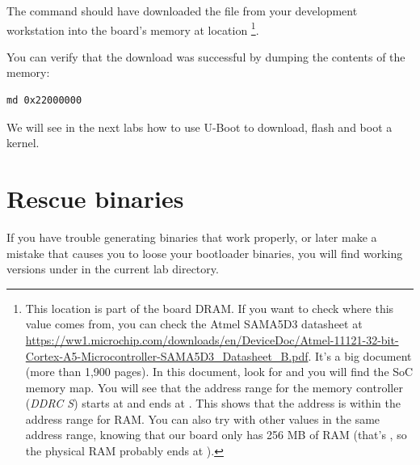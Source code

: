 The  command should have downloaded the
 file from your development workstation into
the board's memory at location \footnote{
This location is part of the board DRAM. If you want
to check where this value comes from, you can check the Atmel SAMA5D3
datasheet at
\url{https://ww1.microchip.com/downloads/en/DeviceDoc/Atmel-11121-32-bit-Cortex-A5-Microcontroller-SAMA5D3_Datasheet_B.pdf}.
It's a big document (more than 1,900 pages). In this document, look
for  and you will find the SoC memory map. You
will see that the address range for the memory controller ({\em DDRC
S}) starts at  and ends at . This
shows that the  address is within the address range
for RAM. You can also try with other values in the same address range,
knowing that our board only has 256 MB of RAM (that's
, so the physical RAM probably ends at
).}.

You can verify that the download was successful by dumping the
contents of the memory:

\begin{verbatim}
md 0x22000000
\end{verbatim}

We will see in the next labs how to use U-Boot to download, flash and
boot a kernel.

\section{Rescue binaries}

If you have trouble generating binaries that work properly, or later
make a mistake that causes you to loose your bootloader binaries, you
will find working versions under  in the current lab
directory.
